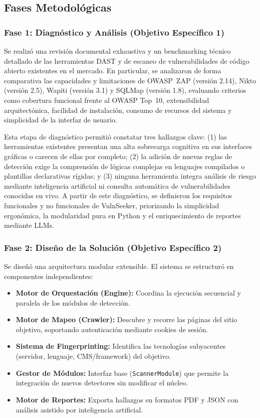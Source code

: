 \documentclass[12pt, a4paper]{article}
\begin{document}
\subsection{Fases Metodológicas}

\subsubsection{Fase 1: Diagnóstico y Análisis (Objetivo Específico 1)}

Se realizó una revisión documental exhaustiva y un benchmarking técnico detallado
de las herramientas DAST y de escaneo de vulnerabilidades de código abierto
existentes en el mercado. En particular, se analizaron de forma comparativa las
capacidades y limitaciones de OWASP~ZAP (versión 2.14), Nikto (versión 2.5),
Wapiti (versión 3.1) y SQLMap (versión 1.8), evaluando criterios como cobertura
funcional frente al OWASP Top~10, extensibilidad arquitectónica, facilidad de
instalación, consumo de recursos del sistema y simplicidad de la interfaz de
usuario.

Esta etapa de diagnóstico permitió constatar tres hallazgos clave: (1) las
herramientas existentes presentan una alta sobrecarga cognitiva en sus interfaces
gráficas o carecen de ellas por completo; (2) la adición de nuevas reglas de
detección exige la comprensión de lógicas complejas en lenguajes compilados o
plantillas declarativas rígidas; y (3) ninguna herramienta integra análisis de
riesgo mediante inteligencia artificial ni consulta automática de vulnerabilidades
conocidas en vivo. A partir de este diagnóstico, se definieron los requisitos
funcionales y no funcionales de VulnSeeker, priorizando la simplicidad ergonómica,
la modularidad pura en Python y el enriquecimiento de reportes mediante LLMs.


\subsubsection{Fase 2: Diseño de la Solución (Objetivo Específico 2)}

Se diseñó una arquitectura modular extensible. El sistema se estructuró en
componentes independientes:

\begin{itemize}
    \item \textbf{Motor de Orquestación (Engine):} Coordina la ejecución
    secuencial y paralela de los módulos de detección.
    \item \textbf{Motor de Mapeo (Crawler):} Descubre y recorre las páginas
    del sitio objetivo, soportando autenticación mediante cookies de sesión.
    \item \textbf{Sistema de Fingerprinting:} Identifica las tecnologías
    subyacentes (servidor, lenguaje, CMS/framework) del objetivo.
    \item \textbf{Gestor de Módulos:} Interfaz base (\texttt{ScannerModule})
    que permite la integración de nuevos detectores sin modificar el núcleo.
    \item \textbf{Motor de Reportes:} Exporta hallazgos en formatos PDF y JSON
    con análisis asistido por inteligencia artificial.
\end{itemize}
\end{document}
